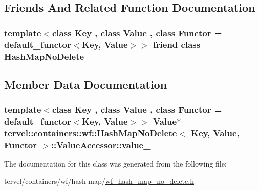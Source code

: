 \subsection{Friends And Related Function Documentation}
\hypertarget{classtervel_1_1containers_1_1wf_1_1_hash_map_no_delete_1_1_value_accessor_a8a4142949547f715390cedfd99659a85}{}
\subsubsection[{Hash\+Map\+No\+Delete}]{\setlength{\rightskip}{0pt plus 5cm}template$<$class Key , class Value , class Functor  = default\+\_\+functor$<$\+Key, Value$>$$>$ friend class {\bf Hash\+Map\+No\+Delete}\hspace{0.3cm}{\ttfamily [friend]}}\label{classtervel_1_1containers_1_1wf_1_1_hash_map_no_delete_1_1_value_accessor_a8a4142949547f715390cedfd99659a85}


\subsection{Member Data Documentation}
\hypertarget{classtervel_1_1containers_1_1wf_1_1_hash_map_no_delete_1_1_value_accessor_a5e4972255abbbd6ae7ff8d7f15d6ff67}{}
\subsubsection[{value\+\_\+}]{\setlength{\rightskip}{0pt plus 5cm}template$<$class Key , class Value , class Functor  = default\+\_\+functor$<$\+Key, Value$>$$>$ {\bf Value}$\ast$ {\bf tervel\+::containers\+::wf\+::\+Hash\+Map\+No\+Delete}$<$ Key, {\bf Value}, Functor $>$\+::Value\+Accessor\+::value\+\_\+\hspace{0.3cm}{\ttfamily [private]}}\label{classtervel_1_1containers_1_1wf_1_1_hash_map_no_delete_1_1_value_accessor_a5e4972255abbbd6ae7ff8d7f15d6ff67}


The documentation for this class was generated from the following file\+:\begin{DoxyCompactItemize}
\item 
tervel/containers/wf/hash-\/map/\hyperlink{wf__hash__map__no__delete_8h}{wf\+\_\+hash\+\_\+map\+\_\+no\+\_\+delete.\+h}\end{DoxyCompactItemize}
